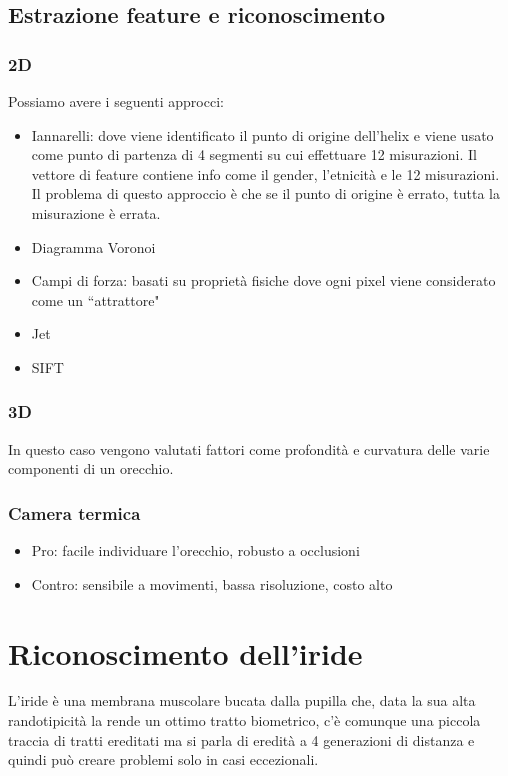 \documentclass{article}
\begin{document}
\subsection{Estrazione feature e riconoscimento}

\subsubsection{2D}
Possiamo avere i seguenti approcci:
\begin{itemize}
    \item Iannarelli: dove viene identificato il punto di origine dell'helix e viene usato come punto di partenza di 4 segmenti su cui effettuare 12 misurazioni. Il vettore di feature contiene info come il gender, l'etnicità e le 12 misurazioni. Il problema di questo approccio è che se il punto di origine è errato, tutta la misurazione è errata.
    \item Diagramma Voronoi
    \item Campi di forza: basati su proprietà fisiche dove ogni pixel viene considerato come un ``attrattore"
    \item Jet
    \item SIFT
\end{itemize}

\subsubsection{3D} In questo caso vengono valutati fattori come profondità e curvatura delle varie componenti di un orecchio.

\subsubsection{Camera termica}
\begin{itemize}
    \item Pro: facile individuare l'orecchio, robusto a occlusioni
    \item Contro: sensibile a movimenti, bassa risoluzione, costo alto
\end{itemize}

\section{Riconoscimento dell'iride}
L'iride è una membrana muscolare bucata dalla pupilla che, data la sua alta randotipicità la rende un ottimo tratto biometrico, c'è comunque una piccola traccia di tratti ereditati ma si parla di eredità a 4 generazioni di distanza e quindi può creare problemi solo in casi eccezionali. 
\end{document}
